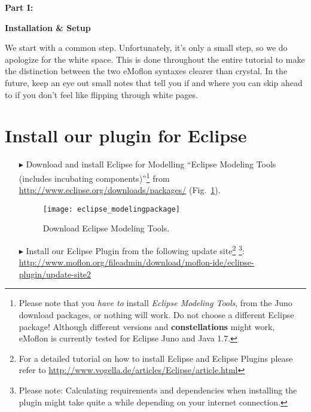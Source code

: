 {\bf \huge Part I:}

\vspace{0.5cm}

{\bf \Huge Installation \& Setup }

\vspace{0.5cm}

\genHeader

We start with a common step. Unfortunately, it's only a small step, so we do apologize for the white space. This is done throughout the entire tutorial to make the distinction between the two eMoflon syntaxes clearer than crystal. In the future, keep an eye out small notes that tell you if and where you can skip ahead to if you don't feel like flipping through white pages.

\section{Install our plugin for Eclipse}
\label{stepTwo}
\begin{enumerate}
\item[$\blacktriangleright$] Download and install Eclipse for Modelling ``Eclipse Modeling Tools (includes incubating components)''\footnote{Please note that you \emph{have to} install \emph{Eclipse Modeling Tools}, from the Juno download packages, or nothing will work.  Do not choose a different Eclipse package!  Although different versions and {\bf constellations} might work, eMoflon is currently tested for Eclipse Juno and Java 1.7.} from \url{http://www.eclipse.org/downloads/packages/} (Fig.~\ref{fig_downloadModelingPackage}).

\begin{figure}[htbp]
	\centering
  	\texttt{[image: eclipse\_modelingpackage]}
	\caption{Download Eclipse Modeling Tools.}
	\label{fig_downloadModelingPackage}
\end{figure}

\item[$\blacktriangleright$] Install our Eclipse Plugin from the following update site\footnote{For a detailed tutorial on how to install Eclipse and Eclipse Plugins please refer to \url{http://www.vogella.de/articles/Eclipse/article.html}} 
\footnote{Please note: Calculating requirements and dependencies when installing the plugin might take quite a while depending on your internet connection.}:
\url{http://www.moflon.org/fileadmin/download/moflon-ide/eclipse-plugin/update-site2}

\end{enumerate}

